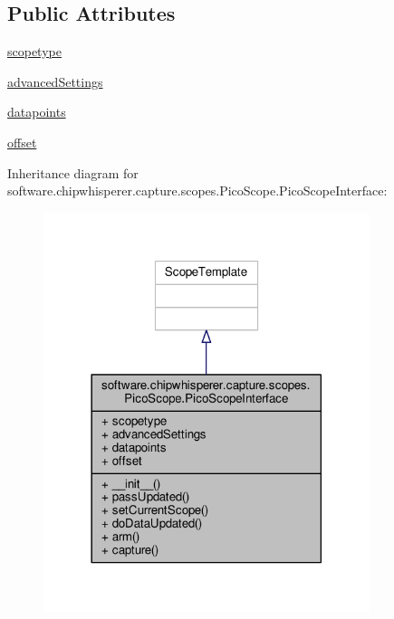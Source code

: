 \subsection*{Public Attributes}
\begin{DoxyCompactItemize}
\item 
\hyperlink{classsoftware_1_1chipwhisperer_1_1capture_1_1scopes_1_1PicoScope_1_1PicoScopeInterface_ae87a5f8e59f87a8a19609b2dba4266ee}{scopetype}
\item 
\hyperlink{classsoftware_1_1chipwhisperer_1_1capture_1_1scopes_1_1PicoScope_1_1PicoScopeInterface_a9aebcb97eacec83777d81e6d73f78929}{advanced\+Settings}
\item 
\hyperlink{classsoftware_1_1chipwhisperer_1_1capture_1_1scopes_1_1PicoScope_1_1PicoScopeInterface_ad9ea43b508d1e01ef4a5be50b086f4e8}{datapoints}
\item 
\hyperlink{classsoftware_1_1chipwhisperer_1_1capture_1_1scopes_1_1PicoScope_1_1PicoScopeInterface_a88fef1117fcd30aadc8ece3e9af43eec}{offset}
\end{DoxyCompactItemize}


Inheritance diagram for software.\+chipwhisperer.\+capture.\+scopes.\+Pico\+Scope.\+Pico\+Scope\+Interface\+:\nopagebreak
\begin{figure}[H]
\begin{center}
\leavevmode
\includegraphics[width=270pt]{da/df1/classsoftware_1_1chipwhisperer_1_1capture_1_1scopes_1_1PicoScope_1_1PicoScopeInterface__inherit__graph}
\end{center}
\end{figure}


